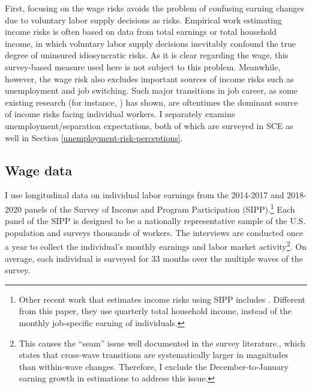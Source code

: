 First, focusing on the wage risks avoids the problem of confusing earning changes due to voluntary labor supply decisions as risks. Empirical work estimating income risks is often based on data from total earnings or total household income, in which voluntary labor supply decisions inevitably confound the true degree of uninsured idiosyncratic risks. As it is clear regarding the wage, this survey-based measure used here is not subject to this problem. Meanwhile, however, the wage risk also excludes important sources of income risks such as unemployment and job switching. Such major transitions in job career, as some existing research (for instance, \cite{low2010wage}) has shown, are oftentimes the dominant source of income risks facing individual workers. I separately examine unemployment/separation expectations, both of which are surveyed in SCE as well in Section \ref{unemployment-risk-perceptions}. 



\subsection{Wage data}

I use longitudinal data on individual labor earnings from the 2014-2017 and 2018-2020 panels of the Survey of Income and Program Participation (SIPP).\footnote{Other recent work that estimates income risks using SIPP includes \cite{bayer2019precautionary}. Different from this paper, they use quarterly total household income, instead of the monthly job-specific earning of individuals.} Each panel of the SIPP is designed to be a nationally representative sample of the U.S. population and surveys thousands of workers. The interviews are conducted once a year to collect the individual's monthly earnings and labor market activity\footnote{This causes the ``seam'' issue well documented in the survey literature\citep{moore2008seam}., which states that cross-wave transitions are systematically larger in magnitudes than within-wave changes. Therefore, I exclude the December-to-January earning growth in estimations to address this issue.}. On average, each individual is surveyed for 33 months over the multiple waves of the survey.

